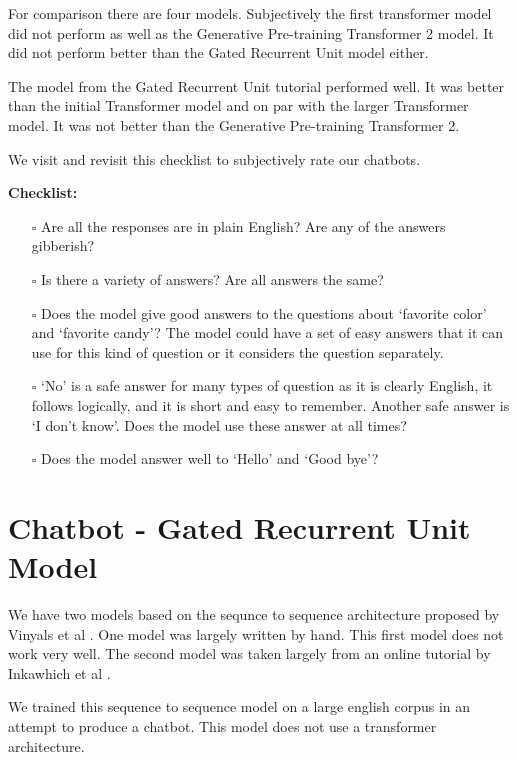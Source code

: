 For comparison there are four models. Subjectively the first transformer model did not perform as well as the Generative Pre-training Transformer 2 model. It did not perform better than the Gated Recurrent Unit model either. 

The model from the Gated Recurrent Unit tutorial performed well. It was better than the initial Transformer model and on par with the larger Transformer model. It was not better than the Generative Pre-training Transformer 2.

We visit and revisit this checklist to subjectively rate our chatbots.

\noindent \textbf{Checklist:} 

\begin{itemize}
	
	\item[$\square$] Are all the responses are in plain English? Are any of the answers gibberish?
	
	\item[$\square$] Is there a  variety of answers? Are all answers the same?
	
	\item[$\square$] Does the model give good answers to the questions about `favorite color' and `favorite candy'? The model could have a set of easy answers that it can use for this kind of question or it considers the question separately. 
	
	\item[$\square$] `No' is a safe answer for many types of question as it is clearly English, it follows logically, and it is short and easy to remember. Another safe answer is `I don't know'. Does the model use these answer at all times?
	
	\item[$\square$] Does the model answer well to `Hello' and `Good bye'?
\end{itemize}


\section{Chatbot - Gated Recurrent Unit Model}
We have two models based on the sequnce to sequence architecture proposed by Vinyals et al \cite{DBLP:journals/corr/VinyalsL15}. One model was largely written by hand. This first model does not work very well. The second model was taken largely from an online tutorial by  Inkawhich et al \cite{2018Inkawhich}.

We trained this sequence to sequence model on a large english corpus in an attempt to produce a chatbot. This model does not use a transformer architecture.

